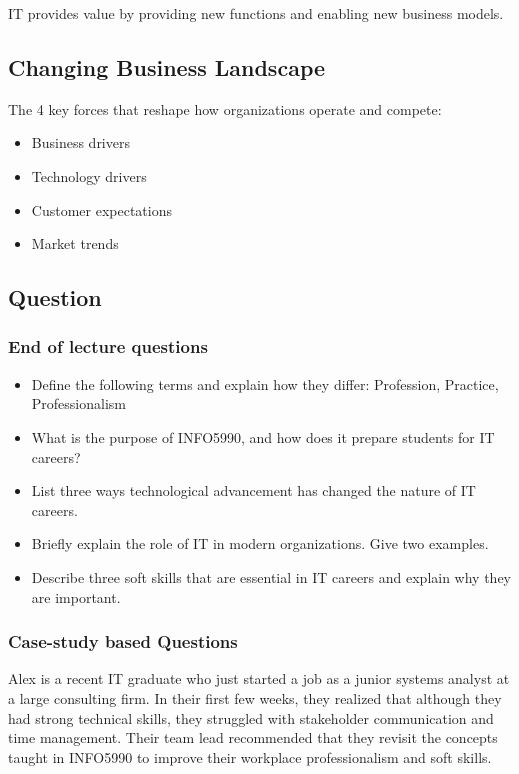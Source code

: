IT provides value by providing new functions and enabling new business models.

\subsection{Changing Business Landscape}

\noindent The 4 key forces that reshape how organizations operate and compete:

\begin{itemize}
    \item Business drivers
    \item Technology drivers
    \item Customer expectations
    \item Market trends
\end{itemize}

\subsection{Question}

\subsubsection{End of lecture questions}

\begin{itemize}
    \item Define the following terms and explain how they differ: Profession, Practice, Professionalism
    \item What is the purpose of INFO5990, and how does it prepare students for IT careers?
    \item List three ways technological advancement has changed the nature of IT careers.
    \item Briefly explain the role of IT in modern organizations. Give two examples.
    \item Describe three soft skills that are essential in IT careers and explain why they are important.
\end{itemize}

\subsubsection{Case-study based Questions}

\indent

Alex is a recent IT graduate who just started a job as a junior systems analyst at a large consulting firm. In their first few weeks, they realized that although they had strong technical skills, they struggled with stakeholder communication and time management. Their team lead recommended that they revisit the concepts taught in INFO5990 to improve their workplace professionalism and soft skills.

